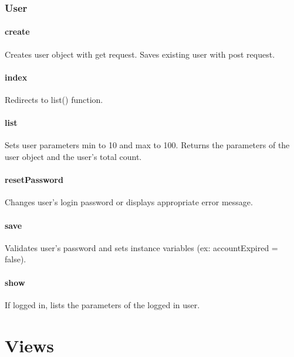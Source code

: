\documentclass[12pt]{article}
\begin{document}
\subsubsection{User}\label{sec:CUser}
\paragraph{create} Creates user object with get request. Saves existing user with post request.
\paragraph{index} Redirects to list() function.
\paragraph{list} Sets user parameters min to 10 and max to 100. Returns the parameters of the user object and the user's total count.
\paragraph{resetPassword} Changes user's login password or displays appropriate error message.
\paragraph{save} Validates user's password and sets instance variables (ex: accountExpired = false).
\paragraph{show} If logged in, lists the parameters of the logged in user.


\section{Views}
\end{document}
